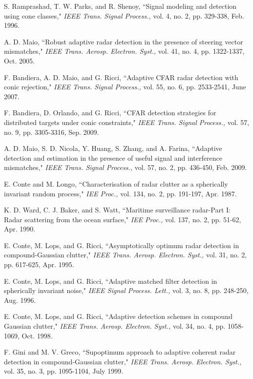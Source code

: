 \begin{thebibliography}{12}
S. Ramprashad, T. W. Parks, and R. Shenoy, ``Signal modeling and detection using cone classes," \emph{IEEE Trans. Signal Process.,} vol. 4, no. 2,
pp. 329-338, Feb. 1996.

 A. D. Maio, ``Robust adaptive radar detection in the presence of steering vector mismatches," \emph{IEEE Trans. Aerosp. Electron. Syst.,} vol. 41,
no. 4, pp. 1322-1337, Oct. 2005.

 F. Bandiera, A. D. Maio, and G. Ricci, ``Adaptive CFAR radar detection with conic rejection," \emph{IEEE Trans. Signal Process.,} vol. 55,
no. 6, pp. 2533-2541, June 2007.

 F. Bandiera, D. Orlando, and G. Ricci, ``CFAR detection strategies for distributed targets under conic constraints," \emph{IEEE Trans. Signal Process.,} vol. 57,
no. 9, pp. 3305-3316, Sep. 2009.

 A. D. Maio, S. D. Nicola, Y. Huang, S. Zhang, and A. Farina, ``Adaptive detection and estimation in the presence of useful signal and interference mismatches," \emph{IEEE Trans. Signal Process.,} vol. 57,
no. 2, pp. 436-450, Feb. 2009.

E. Conte and M. Longo, ``Characterisation of radar clutter as a spherically invariant random process,"
\emph{IEE Proc.,} vol. 134, no. 2, pp. 191-197, Apr. 1987.

K. D. Ward, C. J. Baker, and S. Watt, ``Maritime surveillance radar-Part I: Radar scattering from the ocean surface," \emph{IEE Proc.,} vol. 137, no. 2, pp. 51-62, Apr. 1990.

E. Conte, M. Lops, and G. Ricci, ``Asymptotically optimum radar detection in compound-Gaussian clutter," \emph{IEEE Trans. Aerosp. Electron. Syst.,} vol. 31, no. 2, pp. 617-625, Apr. 1995.

E. Conte, M. Lops, and G. Ricci, ``Adaptive matched filter detection in spherically invariant noise," \emph{IEEE Signal Process. Lett.,} vol. 3, no. 8, pp. 248-250, Aug. 1996.

E. Conte, M. Lops, and G. Ricci, ``Adaptive detection schemes in compound Gaussian clutter," \emph{IEEE Trans. Aerosp. Electron. Syst.,} vol. 34, no. 4, pp. 1058-1069, Oct. 1998.

F. Gini and M. V. Greco, ``Supoptimum approach to adaptive coherent radar detection in compound-Gaussian clutter," \emph{IEEE Trans. Aerosp. Electron. Syst.,} vol. 35, no. 3, pp. 1095-1104, July 1999.


\end{thebibliography}
